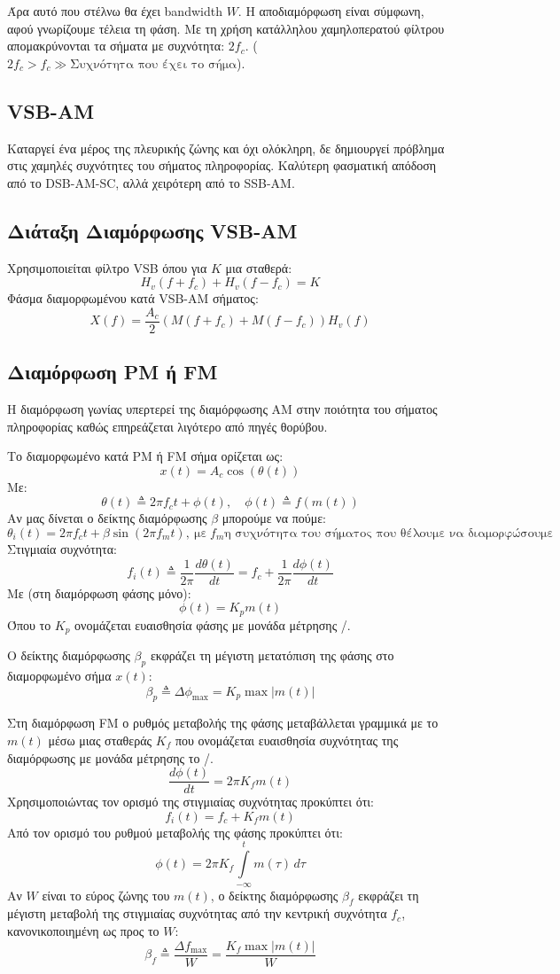 \documentclass[a4paper,12pt]{article}
\begin{document}
Άρα αυτό που στέλνω θα έχει bandwidth \(W\). Η αποδιαμόρφωση είναι σύμφωνη, αφού γνωρίζουμε τέλεια τη φάση. Με τη χρήση κατάλληλου χαμηλοπερατού φίλτρου απομακρύνονται τα σήματα με συχνότητα: \(2f_c\). (\(2f_c > f_c \gg \text{Συχνότητα που έχει το σήμα}\)).

\subsection*{VSB-AM}
Καταργεί ένα μέρος της πλευρικής ζώνης και όχι ολόκληρη, δε δημιουργεί πρόβλημα στις χαμηλές συχνότητες του σήματος πληροφορίας. Καλύτερη φασματική απόδοση από το DSB-AM-SC, αλλά χειρότερη από το SSB-AM.

\subsection*{Διάταξη Διαμόρφωσης VSB-AM}
Χρησιμοποιείται φίλτρο VSB όπου για \(K\) μια σταθερά:
\[
H_v(f+f_c)+H_v(f-f_c)=K
\]
Φάσμα διαμορφωμένου κατά VSB-AM σήματος:
\[
X(f)=\frac{A_c}{2}(M(f+f_c)+M(f-f_c))H_v(f)
\]

\subsection*{Διαμόρφωση PM ή FM}
Η διαμόρφωση γωνίας υπερτερεί της διαμόρφωσης AM στην ποιότητα του σήματος πληροφορίας καθώς επηρεάζεται λιγότερο από πηγές θορύβου.

Το διαμορφωμένο κατά PM ή FM σήμα ορίζεται ως:
\[
x(t)=A_c \cos(\theta(t))
\]
Με:
\[
\theta(t) \triangleq 2\pi f_c t +\phi(t), \quad \phi(t)\triangleq f(m(t))
\]
Αν μας δίνεται ο δείκτης διαμόρφωσης \(\beta\) μπορούμε να πούμε:
\[
\theta_i(t)=2\pi f_c t +\beta \sin(2\pi f_m t), \ \text{με} \ f_m \text{η συχνότητα του σήματος που θέλουμε να διαμορφώσουμε} 
\]
Στιγμιαία συχνότητα:
\[
f_i(t) \triangleq \frac{1}{2\pi} \frac{d \theta(t)}{dt} = f_c + \frac{1}{2\pi} \frac{d \phi(t)}{dt}
\]
Με (στη διαμόρφωση φάσης μόνο):
\[
\phi(t) = K_p m(t)
\]
Όπου το \(K_p\) ονομάζεται ευαισθησία φάσης με μονάδα μέτρησης /.

Ο δείκτης διαμόρφωσης \(\beta_p\) εκφράζει τη μέγιστη μετατόπιση της φάσης στο διαμορφωμένο σήμα \(x(t)\):
\[
\beta_p \triangleq \Delta \phi_{\text{max}} = K_p \max |m(t)|
\]

Στη διαμόρφωση FM ο ρυθμός μεταβολής της φάσης μεταβάλλεται γραμμικά με το \(m(t)\) μέσω μιας σταθεράς \(K_f\) που ονομάζεται ευαισθησία συχνότητας της διαμόρφωσης με μονάδα μέτρησης το /.
\[
\frac{d \phi(t)}{dt}=2 \pi K_f m(t)
\]
Χρησιμοποιώντας τον ορισμό της στιγμιαίας συχνότητας προκύπτει ότι:
\[
f_i(t)=f_c + K_f m(t)
\]
Από τον ορισμό του ρυθμού μεταβολής της φάσης προκύπτει ότι:
\[
\phi (t) = 2 \pi K_f \int\limits_{-\infty}^t m(\tau) \, d\tau
\]
Αν \(W\) είναι το εύρος ζώνης του \(m(t)\), ο δείκτης διαμόρφωσης \(\beta_f\) εκφράζει τη μέγιστη μεταβολή της στιγμιαίας συχνότητας από την κεντρική συχνότητα \(f_c\), κανονικοποιημένη ως προς το \(W\):
\[
\beta_f \triangleq \frac{\Delta f_{\max}}{W}=\frac{K_f \max |m(t)|}{W}
\]
\end{document}
